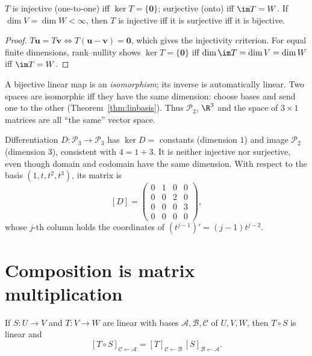 \begin{theorem}\label{thm:injsurj}
$T$ is injective (one-to-one) iff $\ker T=\{\mathbf{0}\}$; surjective (onto) iff $\im T=W$. If $\dim V=\dim W<\infty$, then $T$ is injective iff it is surjective iff it is bijective.
\end{theorem}

\begin{proof}
$T\mathbf{u}=T\mathbf{v}\iff T(\mathbf{u}-\mathbf{v})=\mathbf{0}$, which gives the injectivity criterion. For equal finite dimensions, rank--nullity shows $\ker T=\{\mathbf{0}\}$ iff $\dim\im T=\dim V=\dim W$ iff $\im T=W$.
\end{proof}

A bijective linear map is an \emph{isomorphism}; its inverse is automatically linear. Two spaces are isomorphic iff they have the same dimension: choose bases and send one to the other (Theorem~\ref{thm:linbasis}). Thus $\mathcal{P}_2$, $\R^3$ and the space of $3\times1$ matrices are all ``the same'' vector space.

\begin{example}
Differentiation $D:\mathcal{P}_3\to\mathcal{P}_3$ has $\ker D=$ constants (dimension $1$) and image $\mathcal{P}_2$ (dimension $3$), consistent with $4=1+3$. It is neither injective nor surjective, even though domain and codomain have the same dimension. With respect to the basis $(1,t,t^2,t^3)$, its matrix is
\[ [D]=\begin{pmatrix}0&1&0&0\\0&0&2&0\\0&0&0&3\\0&0&0&0\end{pmatrix}, \]
whose $j$-th column holds the coordinates of $(t^{j-1})'=(j-1)t^{j-2}$.
\end{example}

\section{Composition is matrix multiplication}

\begin{theorem}[Composition]\label{thm:composition}
If $S:U\to V$ and $T:V\to W$ are linear with bases $\mathcal{A},\mathcal{B},\mathcal{C}$ of $U,V,W$, then $T\circ S$ is linear and
\[ [T\circ S]_{\mathcal{C}\leftarrow\mathcal{A}}=[T]_{\mathcal{C}\leftarrow\mathcal{B}}\,[S]_{\mathcal{B}\leftarrow\mathcal{A}}. \]
\end{theorem}

